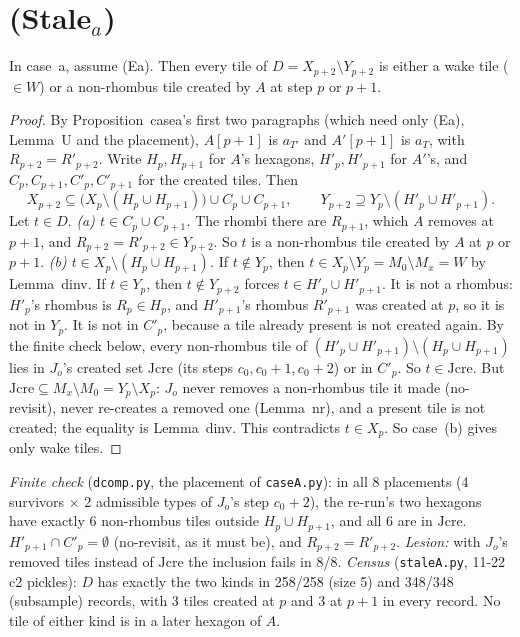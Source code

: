 \documentclass[11pt]{article}
\theoremstyle{definition}\newtheorem{definition}[theorem]{Definition}\newtheorem{remark}[theorem]{Remark}
\begin{document}
\section{(Stale$_a$)}\label{sec:stale}
\begin{lemma}[composition of $D$]\label{lem:dcomp}
In case~a, assume (Ea). Then every tile of $D=X_{p+2}\setminus Y_{p+2}$ is either a wake tile ($\in W$) or a non-rhombus tile created by $A$ at step $p$ or $p+1$.
\end{lemma}
\begin{proof}
By Proposition~casea's first two paragraphs (which need only (Ea), Lemma~U and the placement), $A[p+1]$ is $a_{T'}$ and $A'[p+1]$ is $a_T$, with $R_{p+2}=R'_{p+2}$. Write $H_p,H_{p+1}$ for $A$'s hexagons, $H'_p,H'_{p+1}$ for $A'$'s, and $C_p,C_{p+1},C'_p,C'_{p+1}$ for the created tiles. Then
\[X_{p+2}\subseteq\bigl(X_p\setminus(H_p\cup H_{p+1})\bigr)\cup C_p\cup C_{p+1},\qquad Y_{p+2}\supseteq Y_p\setminus(H'_p\cup H'_{p+1}).\]
Let $t\in D$.
\emph{(a) $t\in C_p\cup C_{p+1}$.} The rhombi there are $R_{p+1}$, which $A$ removes at $p+1$, and $R_{p+2}=R'_{p+2}\in Y_{p+2}$. So $t$ is a non-rhombus tile created by $A$ at $p$ or $p+1$.
\emph{(b) $t\in X_p\setminus(H_p\cup H_{p+1})$.} If $t\notin Y_p$, then $t\in X_p\setminus Y_p=M_0\setminus M_x=W$ by Lemma~dinv. If $t\in Y_p$, then $t\notin Y_{p+2}$ forces $t\in H'_p\cup H'_{p+1}$. It is not a rhombus: $H'_p$'s rhombus is $R_p\in H_p$, and $H'_{p+1}$'s rhombus $R'_{p+1}$ was created at $p$, so it is not in $Y_p$. It is not in $C'_p$, because a tile already present is not created again. By the finite check below, every non-rhombus tile of $(H'_p\cup H'_{p+1})\setminus(H_p\cup H_{p+1})$ lies in $J_o$'s created set $\mathrm{Jcre}$ (its steps $c_0,c_0+1,c_0+2$) or in $C'_p$. So $t\in\mathrm{Jcre}$. But $\mathrm{Jcre}\subseteq M_x\setminus M_0=Y_p\setminus X_p$: $J_o$ never removes a non-rhombus tile it made (no-revisit), never re-creates a removed one (Lemma~nr), and a present tile is not created; the equality is Lemma~dinv. This contradicts $t\in X_p$. So case~(b) gives only wake tiles.
\end{proof}
\noindent\emph{Finite check} (\texttt{dcomp.py}, the placement of \texttt{caseA.py}): in all 8 placements (4 survivors $\times$ 2 admissible types of $J_o$'s step $c_0+2$), the re-run's two hexagons have exactly 6 non-rhombus tiles outside $H_p\cup H_{p+1}$, and all 6 are in $\mathrm{Jcre}$. $H'_{p+1}\cap C'_p=\emptyset$ (no-revisit, as it must be), and $R_{p+2}=R'_{p+2}$. \emph{Lesion:} with $J_o$'s removed tiles instead of $\mathrm{Jcre}$ the inclusion fails in 8/8.
\emph{Census} (\texttt{staleA.py}, 11-22 c2 pickles): $D$ has exactly the two kinds in 258/258 (size 5) and 348/348 (subsample) records, with 3 tiles created at $p$ and 3 at $p+1$ in every record. No tile of either kind is in a later hexagon of $A$.
\end{document}
